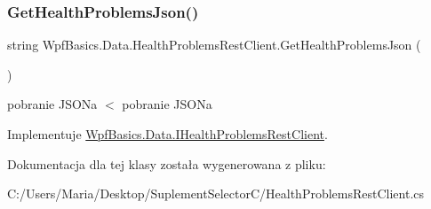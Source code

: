\subsubsection{\texorpdfstring{Get\+Health\+Problems\+Json()}{GetHealthProblemsJson()}}
{\footnotesize\ttfamily string Wpf\+Basics.\+Data.\+Health\+Problems\+Rest\+Client.\+Get\+Health\+Problems\+Json (\begin{DoxyParamCaption}{ }\end{DoxyParamCaption})}

pobranie J\+S\+ON\textquotesingle{}a $<$ pobranie J\+S\+ON\textquotesingle{}a 

Implementuje \hyperlink{interface_wpf_basics_1_1_data_1_1_i_health_problems_rest_client_a1a7509e5e42db251942980c8a0d648d0}{Wpf\+Basics.\+Data.\+I\+Health\+Problems\+Rest\+Client}.



Dokumentacja dla tej klasy została wygenerowana z pliku\+:\begin{DoxyCompactItemize}
\item 
C\+:/\+Users/\+Maria/\+Desktop/\+Suplement\+Selector\+C/Health\+Problems\+Rest\+Client.\+cs\end{DoxyCompactItemize}
